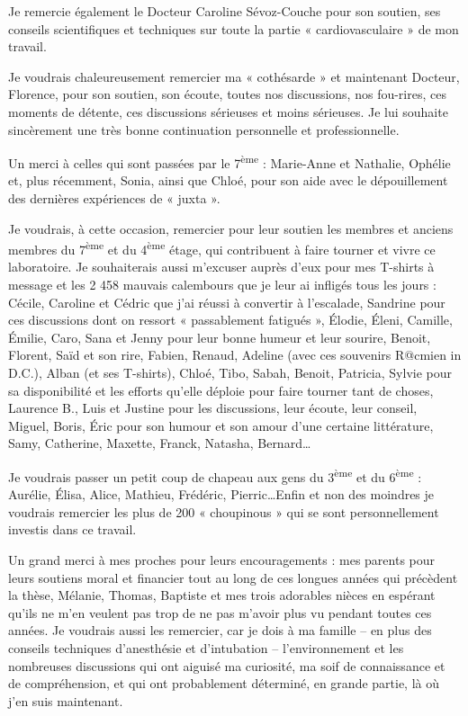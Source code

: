 \documentclass[a4paper,12pt,twoside]{report}
\begin{document}
\begin{onehalfspacing}
Je remercie également le Docteur Caroline Sévoz-Couche pour son soutien, ses conseils scientifiques et techniques sur toute la partie « cardiovasculaire » de mon travail. 

Je voudrais chaleureusement remercier ma « cothésarde » et maintenant Docteur, Florence, pour son soutien, son écoute, toutes nos discussions, nos fou-rires, ces moments de détente, ces discussions sérieuses et moins sérieuses. Je lui souhaite sincèrement une très bonne continuation personnelle et professionnelle.

Un merci à celles qui sont passées par le 7\textsuperscript{ème} : Marie-Anne et Nathalie, Ophélie et, plus récemment, Sonia, ainsi que Chloé, pour son aide avec le dépouillement des dernières expériences de « juxta ».

\vspace{0.5cm}
Je voudrais, à cette occasion, remercier pour leur soutien les membres et anciens membres du 7\textsuperscript{ème} et du 4\textsuperscript{ème} étage, qui contribuent à faire tourner et vivre ce laboratoire. Je souhaiterais aussi m’excuser auprès d’eux pour mes T-shirts à message et les 2 458 mauvais calembours que je leur ai infligés tous les jours : Cécile, Caroline et Cédric que j’ai réussi à convertir à l’escalade, Sandrine pour ces discussions dont on ressort « passablement fatigués », \' Elodie, \' Eleni, Camille, \' Emilie, Caro, Sana et Jenny pour leur bonne humeur et leur sourire, Benoit, Florent, Saïd et son rire, Fabien, Renaud, Adeline (avec ces souvenirs R@cmien in D.C.), Alban (et ses T-shirts), Chloé, Tibo, Sabah, Benoit, Patricia, Sylvie pour sa disponibilité et les efforts qu’elle déploie pour faire tourner tant de choses, Laurence B., Luis et Justine pour les discussions, leur écoute, leur conseil, Miguel, Boris, \' Eric pour son humour et son amour d’une certaine littérature, Samy, Catherine, Maxette, Franck, Natasha, Bernard\ldots 

Je voudrais passer un petit coup de chapeau aux gens du 3\textsuperscript{ème} et du 6\textsuperscript{ème} : Aurélie, \' Elisa, Alice, Mathieu, Frédéric, Pierric\ldots Enfin et non des moindres je voudrais remercier les plus de 200 « choupinous » qui se sont personnellement investis dans ce travail.

\vspace{0.5cm}
Un grand merci à mes proches pour leurs encouragements : mes parents pour leurs soutiens moral et financier tout au long de ces longues années qui précèdent la thèse, Mélanie, Thomas, Baptiste et mes trois adorables nièces en espérant qu’ils ne m’en veulent pas trop de ne pas m’avoir plus vu pendant toutes ces années. Je voudrais aussi les remercier, car je dois à ma famille – en plus des conseils techniques d’anesthésie et d’intubation – l’environnement et les nombreuses discussions qui ont aiguisé ma curiosité, ma soif de connaissance et de compréhension, et qui ont probablement déterminé, en grande partie, là où j’en suis maintenant.


\end{onehalfspacing}
\end{document}
